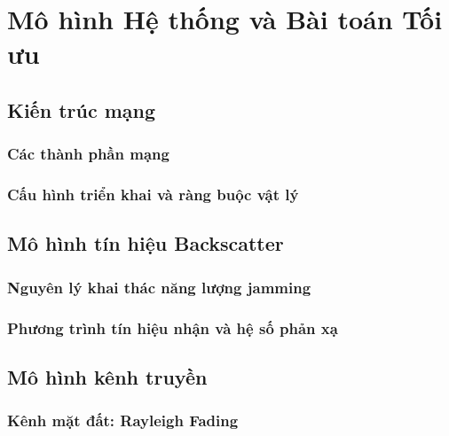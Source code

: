 \chapter{Mô hình Hệ thống và Bài toán Tối ưu}
\label{chap:system}

\section{Kiến trúc mạng}
\label{sec:sys:architecture}

\subsection{Các thành phần mạng}
\label{subsec:sys:entities}

\subsection{Cấu hình triển khai và ràng buộc vật lý}
\label{subsec:sys:deployment}

\section{Mô hình tín hiệu Backscatter}
\label{sec:sys:signal}

\subsection{Nguyên lý khai thác năng lượng jamming}
\label{subsec:sys:signal:harvest}

\subsection{Phương trình tín hiệu nhận và hệ số phản xạ}
\label{subsec:sys:signal:eq}

\section{Mô hình kênh truyền}
\label{sec:sys:channel}

\subsection{Kênh mặt đất: Rayleigh Fading}
\label{subsec:sys:channel:ground}

